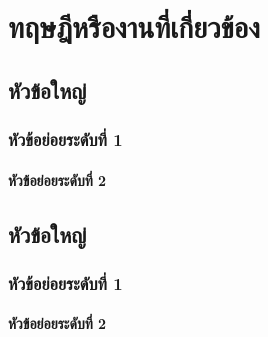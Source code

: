 \chapter{ทฤษฎีหรืองานที่เกี่ยวข้อง}
\label{chapter2}

\section{หัวข้อใหญ่}

\subsection{หัวข้อย่อยระดับที่ 1}

\subsubsection{หัวข้อย่อยระดับที่ 2}

\section{หัวข้อใหญ่}

\subsection{หัวข้อย่อยระดับที่ 1}

\subsubsection{หัวข้อย่อยระดับที่ 2}
